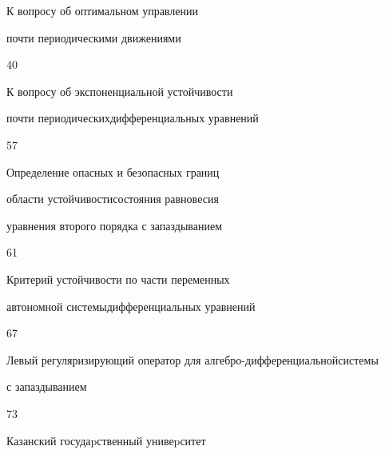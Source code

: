 

{К вопросу об оптимальном управлении 


почти периодическими движениями}{40}




{К вопросу об экспоненциальной устойчивости  


почти периодических\newline дифференциальных уравнений}{57}




{Определение опасных и безопасных границ  


области устойчивости\newline состояния равновесия  


уравнения второго порядка с запаздыванием}{61}




{Критерий устойчивости по части переменных 


автономной системы\newline дифференциальных уравнений}{67}




{Левый регуляризирующий оператор для алгебро-дифференциальной\newline системы 


с запаздыванием}{73}














\vfill


\noindent\raisebox{2pt}{\copyright} Казанский госудаpственный унивеpситет





